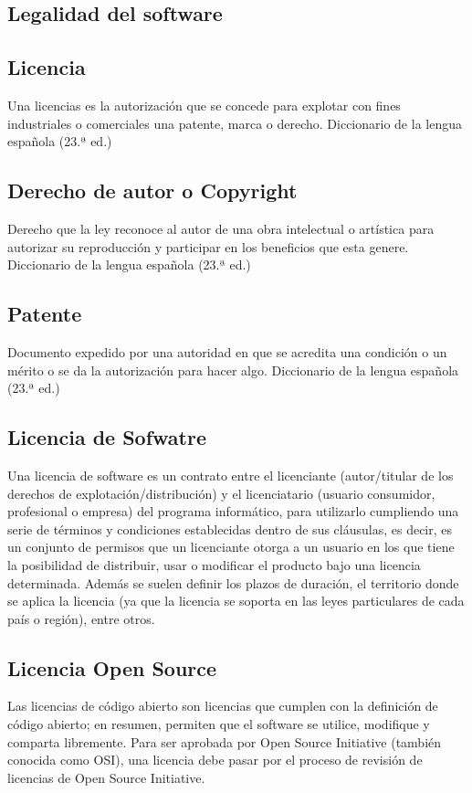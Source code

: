 \begin{spacing}{1.5}
\section{Legalidad del software}
	\subsection{Licencia}
	Una licencias es la autorización que se concede para explotar con fines industriales o comerciales una patente, marca o derecho. Diccionario de la lengua española (23.ª ed.)
	
	\subsection{Derecho de autor o Copyright}
	Derecho que la ley reconoce al autor de una obra intelectual o artística para autorizar su reproducción y participar en los beneficios que esta genere. Diccionario de la lengua española (23.ª ed.)
	
	\subsection{Patente}
	Documento expedido por una autoridad en que se acredita una condición o un mérito o se da la autorización para hacer algo. Diccionario de la lengua española (23.ª ed.)
	
	\subsection{Licencia de Sofwatre}
	Una licencia de software es un contrato entre el licenciante (autor/titular de los derechos de explotación/distribución) y el licenciatario (usuario consumidor, profesional o empresa) del programa informático, para utilizarlo cumpliendo una serie de términos y condiciones establecidas dentro de sus cláusulas, es decir, es un conjunto de permisos que un licenciante otorga a un usuario en los que tiene la posibilidad de distribuir, usar o modificar el producto bajo una licencia determinada. Además se suelen definir los plazos de duración, el territorio donde se aplica la licencia (ya que la licencia se soporta en las leyes particulares de cada país o región), entre otros.
	
	\subsection{Licencia Open Source}
	Las licencias de código abierto son licencias que cumplen con la definición de código abierto; en resumen, permiten que el software se utilice, modifique y comparta libremente. Para ser aprobada por Open Source Initiative (también conocida como OSI), una licencia debe pasar por el proceso de revisión de licencias de Open Source Initiative.\cite{chap2_open_source_2}\\
	

\end{spacing}
